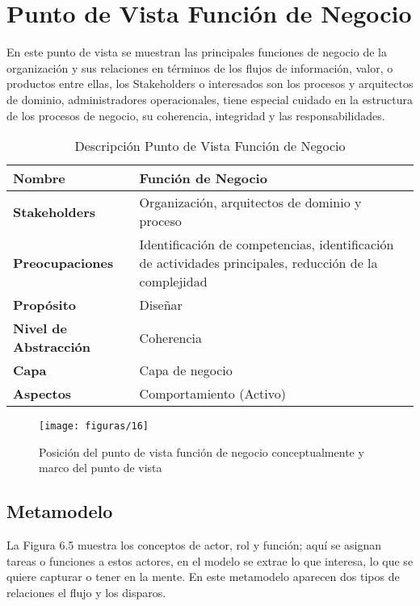   \section{Punto de Vista Función de Negocio}
  En este punto de vista se muestran las principales funciones de negocio de la organización y sus relaciones en términos de los flujos de información, valor, o productos entre ellas, los Stakeholders o interesados son los procesos y arquitectos de dominio, administradores operacionales, tiene especial cuidado en la estructura de los procesos de negocio, su coherencia, integridad y las responsabilidades.

  \begin{table}[H]
  	\centering
  	\begin{tabular}{lp{8cm}}
  		\toprule
  		\textbf{Nombre} & \textbf{Función de Negocio} \\
  		\midrule
  		\textbf{Stakeholders} & Organización, arquitectos de dominio y proceso \\
  		\textbf{Preocupaciones} & Identificación de competencias, identificación de actividades principales, reducción de la complejidad \\
  		\textbf{Propósito} & Diseñar \\
  		\textbf{Nivel de Abstracción} & Coherencia \\
  		\textbf{Capa} & Capa de negocio \\
  		\textbf{Aspectos} & Comportamiento (Activo) \\
  		\bottomrule
  	\end{tabular}
   	\captionsetup{width=.95\textwidth}
   	\caption{Descripción Punto de Vista Función de Negocio}
   	\label{Tab:tabla6}
  \end{table}

  \begin{figure}[H]
   	\centering
   	\texttt{[image: figuras/16]}
   	\captionsetup{width=.95\textwidth}
   	\caption{Posición del punto de vista función de negocio conceptualmente y marco del punto de vista}
   	\label{figura16}
   \end{figure}
    
   \subsection{Metamodelo}
   La Figura 6.5 muestra los conceptos de actor, rol y función; aquí se asignan tareas o funciones a estos actores, en el modelo se extrae lo que interesa, lo que se quiere capturar o tener en la mente. En este metamodelo aparecen dos tipos de relaciones el flujo y los disparos.
    
